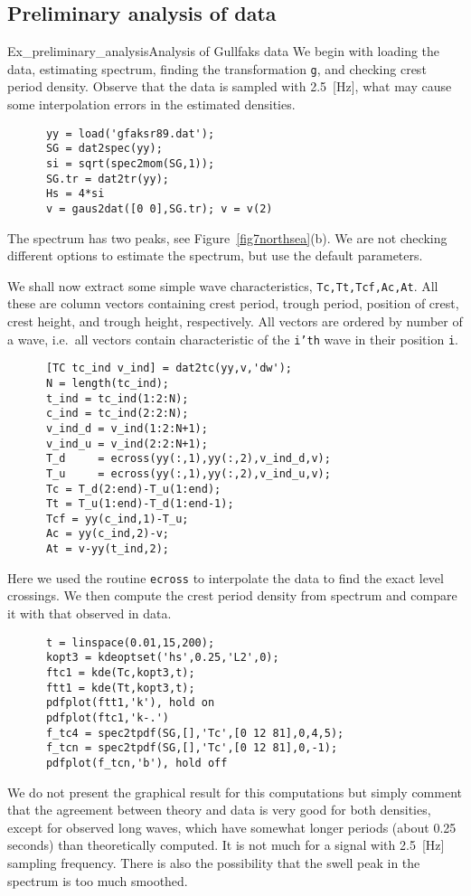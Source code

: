 \subsection{Preliminary analysis of data}
\begin{rtex}{Ex_preliminary_analysis}{Analysis of Gullfaks data}
  We begin with loading the data, estimating spectrum, finding the
  transformation {\tt g}, and checking crest period density. Observe that
  the data is sampled with 2.5~[Hz], what may cause some interpolation
  errors in the estimated densities.
{\small
\begin{verbatim}
      yy = load('gfaksr89.dat');
      SG = dat2spec(yy);
      si = sqrt(spec2mom(SG,1));
      SG.tr = dat2tr(yy);
      Hs = 4*si
      v = gaus2dat([0 0],SG.tr); v = v(2)
\end{verbatim}
} 
\noindent
The spectrum has two peaks, see  Figure~\ref{fig7northsea}(b).
We are not checking different options to estimate the spectrum,
but use the default parameters.

We shall now extract some simple wave characteristics, {\tt Tc,Tt,Tcf,Ac,At}.
All these are column vectors containing crest period, trough period, position
of crest, crest height, and trough height, respectively.
All vectors are ordered by number of a wave, i.e.\ all vectors contain
characteristic of the {\tt i'th} wave in their position \verb+i+.
{\small
\begin{verbatim}
      [TC tc_ind v_ind] = dat2tc(yy,v,'dw');
      N = length(tc_ind);
      t_ind = tc_ind(1:2:N);
      c_ind = tc_ind(2:2:N);
      v_ind_d = v_ind(1:2:N+1);
      v_ind_u = v_ind(2:2:N+1);
      T_d     = ecross(yy(:,1),yy(:,2),v_ind_d,v);
      T_u     = ecross(yy(:,1),yy(:,2),v_ind_u,v);
      Tc = T_d(2:end)-T_u(1:end);
      Tt = T_u(1:end)-T_d(1:end-1);
      Tcf = yy(c_ind,1)-T_u;
      Ac = yy(c_ind,2)-v;
      At = v-yy(t_ind,2);
\end{verbatim}
} 
\noindent
Here we used the routine \verb+ecross+ to interpolate the data to find the exact 
level crossings. 
We then compute the crest period density from spectrum and compare it with
that observed in data.
{\small\begin{verbatim}
      t = linspace(0.01,15,200);
      kopt3 = kdeoptset('hs',0.25,'L2',0);
      ftc1 = kde(Tc,kopt3,t);
      ftt1 = kde(Tt,kopt3,t);
      pdfplot(ftt1,'k'), hold on
      pdfplot(ftc1,'k-.')
      f_tc4 = spec2tpdf(SG,[],'Tc',[0 12 81],0,4,5);
      f_tcn = spec2tpdf(SG,[],'Tc',[0 12 81],0,-1);
      pdfplot(f_tcn,'b'), hold off
\end{verbatim}
}  

We do not present the graphical result for this computations but simply
comment that the agreement between theory and data is very good for
both densities,
except for observed long waves, which  have somewhat longer periods
(about 0.25 seconds) than theoretically computed.  It is not much for a signal
with 2.5~[Hz] sampling frequency. There is also the possibility that the
swell peak in the spectrum is too much smoothed.
\end{rtex}

